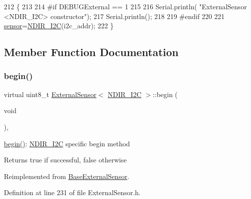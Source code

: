 \begin{DoxyCode}
212     \{
213     
214 \textcolor{preprocessor}{    #if DEBUGExternal == 1 }
215 
216         Serial.println( \textcolor{stringliteral}{"ExternalSensor <NDIR\_I2C> constructor"});
217         Serial.println();
218     
219 \textcolor{preprocessor}{    #endif}
220 
221         \hyperlink{class_external_sensor_3_01_n_d_i_r___i2_c_01_4_ae541c9cece7c38674b70114cdb74a7dc}{sensor}=\hyperlink{class_n_d_i_r___i2_c}{NDIR\_I2C}(i2c\_addr);
222     \}
\end{DoxyCode}


\subsection{Member Function Documentation}
\mbox{\label{class_external_sensor_3_01_n_d_i_r___i2_c_01_4_ac6f3614d94968ef0cc11b2b4d69cef03}} 
\subsubsection{\texorpdfstring{begin()}{begin()}}
{\footnotesize\ttfamily virtual uint8\+\_\+t \hyperlink{class_external_sensor}{External\+Sensor}$<$ \hyperlink{class_n_d_i_r___i2_c}{N\+D\+I\+R\+\_\+\+I2C} $>$\+::begin (\begin{DoxyParamCaption}\item[{void}]{ }\end{DoxyParamCaption})\hspace{0.3cm}{\ttfamily [inline]}, {\ttfamily [virtual]}}

\hyperlink{class_external_sensor_3_01_n_d_i_r___i2_c_01_4_ac6f3614d94968ef0cc11b2b4d69cef03}{begin()}\+: \hyperlink{class_n_d_i_r___i2_c}{N\+D\+I\+R\+\_\+\+I2C} specific begin method

\begin{DoxyReturn}{Returns}
true if successful, false otherwise 
\end{DoxyReturn}


Reimplemented from \hyperlink{class_base_external_sensor_a87d132803d4f4fdd4e66332809f0c9a0}{Base\+External\+Sensor}.



Definition at line 231 of file External\+Sensor.\+h.


